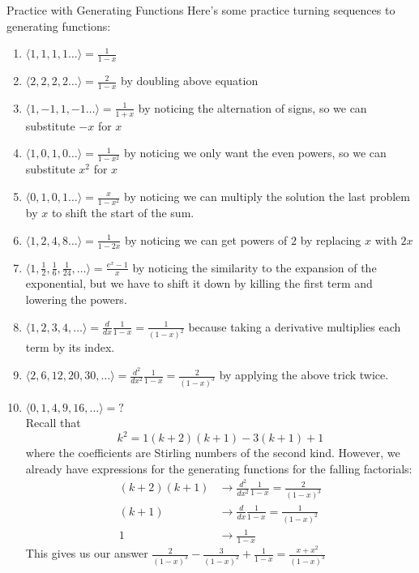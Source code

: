 \begin{subsection}{Practice with Generating Functions}
Here's some practice turning sequences to generating functions:
\begin{enumerate}[a]
\item $\langle 1, 1, 1, 1 \ldots \rangle = \frac{1}{1-x}$
\item $\langle 2, 2, 2, 2 \ldots \rangle = \frac{2}{1-x}$ by doubling above equation
\item $\langle 1, -1, 1, -1 \ldots \rangle = \frac{1}{1+x}$ by noticing the alternation of signs, so we can substitute $-x$ for $x$
\item $\langle 1, 0, 1, 0 \ldots \rangle = \frac{1}{1-x^2}$ by noticing we only want the even powers, so we can substitute $x^2$ for $x$
\item $\langle 0, 1, 0, 1 \ldots \rangle = \frac{x}{1-x^2}$ by noticing we can multiply the solution the last problem by $x$ to shift the start of the sum.
\item $\langle 1, 2, 4, 8 \ldots \rangle = \frac{1}{1-2x}$ by noticing we can get powers of $2$ by replacing $x$ with $2x$
\item $\langle 1, \frac12, \frac16, \frac{1}{24}, \ldots \rangle = \frac{e^x - 1}{x}$ by noticing the similarity to the expansion of the exponential, but we have to shift it down by killing the first term and lowering the powers.
\item $\langle 1, 2, 3, 4, \ldots \rangle = \frac{d}{dx}\frac{1}{1-x} = \frac{1}{(1-x)^2}$ because taking a derivative multiplies each term by its index.
\item $\langle 2, 6, 12, 20, 30, \ldots \rangle = \frac{d^2}{dx^2}\frac{1}{1-x} = \frac{2}{(1-x)^3}$ by applying the above trick twice.
\item $\langle 0, 1, 4, 9, 16, \ldots \rangle = ?$ \\
Recall that 
$$k^2 = 1(k+2)(k+1) - 3(k+1) + 1$$ where the coefficients are Stirling numbers of the second kind. However, we already have expressions for the generating functions for the falling factorials: 
\begin{align*}
    (k+2)(k+1) &\rightarrow \frac{d^2}{dx^2}\frac{1}{1-x} = \frac{2}{(1-x)^3} \\
    (k+1) &\rightarrow \frac{d}{dx}\frac{1}{1-x} = \frac{1}{(1-x)^2} \\
    1 &\rightarrow \frac{1}{1-x}
\end{align*}
This gives us our answer $\frac{2}{(1-x)^3} - \frac{3}{(1-x)^2} + \frac{1}{1-x} = \frac{x + x^2}{(1-x)^3}$
\end{enumerate}
\end{subsection}
